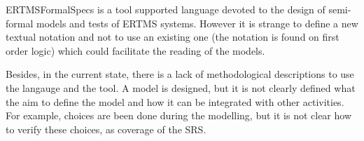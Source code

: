 \begin{assessor2}
ERTMSFormalSpecs is a tool supported language devoted to  the design of semi-formal models and tests of ERTMS systems. However it is strange to define a new textual notation and not to  use an existing one (the notation is found on first order logic) which could facilitate the reading of the models.

Besides, in the current state, there is a lack of methodological descriptions to  use the langauge and the tool. A model is designed, but it is not clearly  defined what the aim to  define the model and how it can be integrated with other activities.  For example, choices are been done during the modelling, but it is not clear how to  verify these choices, as coverage of the SRS.
\end{assessor2}
